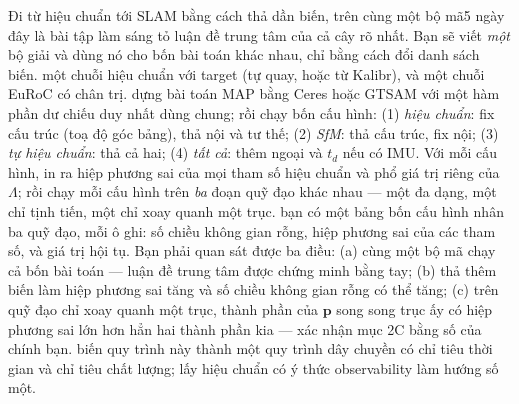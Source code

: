 \documentclass[../../vslam.tex]{subfiles}
\begin{document}
\begin{duan}{Đi từ hiệu chuẩn tới SLAM bằng cách thả dần biến, trên cùng một bộ mã}{5 ngày}
\dmt đây là bài tập làm sáng tỏ luận đề trung tâm của cả cây rõ nhất. Bạn sẽ viết \emph{một} bộ giải và dùng nó cho bốn bài toán khác nhau, chỉ bằng cách đổi danh sách biến.
\ddl một chuỗi hiệu chuẩn với target (tự quay, hoặc từ Kalibr), và một chuỗi EuRoC có chân trị.
\dbc dựng bài toán MAP bằng Ceres hoặc GTSAM với một hàm phần dư chiếu duy nhất dùng chung; rồi chạy bốn cấu hình: (1) \emph{hiệu chuẩn}: fix cấu trúc (toạ độ góc bảng), thả nội và tư thế; (2) \emph{SfM}: thả cấu trúc, fix nội; (3) \emph{tự hiệu chuẩn}: thả cả hai; (4) \emph{tất cả}: thêm ngoại và \(t_d\) nếu có IMU. Với mỗi cấu hình, in ra hiệp phương sai của mọi tham số hiệu chuẩn và phổ giá trị riêng của \(\Lambda\); rồi chạy mỗi cấu hình trên \emph{ba} đoạn quỹ đạo khác nhau --- một đa dạng, một chỉ tịnh tiến, một chỉ xoay quanh một trục.
\dxk bạn có một bảng bốn cấu hình nhân ba quỹ đạo, mỗi ô ghi: số chiều không gian rỗng, hiệp phương sai của các tham số, và giá trị hội tụ. Bạn phải quan sát được ba điều: (a) cùng một bộ mã chạy cả bốn bài toán --- luận đề trung tâm được chứng minh bằng tay; (b) thả thêm biến làm hiệp phương sai tăng và số chiều không gian rỗng có thể tăng; (c) trên quỹ đạo chỉ xoay quanh một trục, thành phần của \(\mathbf{p}\) song song trục ấy có hiệp phương sai lớn hơn hẳn hai thành phần kia --- xác nhận mục 2C bằng số của chính bạn.
\dnv {} biến quy trình này thành một quy trình dây chuyền có chỉ tiêu thời gian và chỉ tiêu chất lượng;  lấy hiệu chuẩn có ý thức observability làm hướng số một.
\end{duan}
\end{document}
